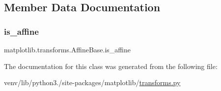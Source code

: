 \subsection{Member Data Documentation}
\mbox{\label{classmatplotlib_1_1transforms_1_1AffineBase_a2ec5cf63d7c391ee8369aab1dc5a1d43}} 
\subsubsection{\texorpdfstring{is\+\_\+affine}{is\_affine}}
{\footnotesize\ttfamily matplotlib.\+transforms.\+Affine\+Base.\+is\+\_\+affine\hspace{0.3cm}{\ttfamily [static]}}



The documentation for this class was generated from the following file\+:\begin{DoxyCompactItemize}
\item 
venv/lib/python3./site-\/packages/matplotlib/\hyperlink{transforms_8py}{transforms.\+py}\end{DoxyCompactItemize}
